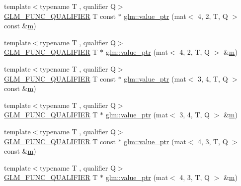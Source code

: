 \begin{DoxyCompactItemize}
\item 
{\footnotesize template$<$typename T , qualifier Q$>$ }\\\hyperlink{setup_8hpp_a33fdea6f91c5f834105f7415e2a64407}{G\+L\+M\+\_\+\+F\+U\+N\+C\+\_\+\+Q\+U\+A\+L\+I\+F\+I\+ER} T const  $\ast$ \hyperlink{group__gtc__type__ptr_gaf8be997c8fa6dea9773f195e35f2df05}{glm\+::value\+\_\+ptr} (mat$<$ 4, 2, T, Q $>$ const \&\hyperlink{_s_d_l__opengl__glext_8h_af593500c283bf1a787a6f947f503a5c2}{m})
\item 
{\footnotesize template$<$typename T , qualifier Q$>$ }\\\hyperlink{setup_8hpp_a33fdea6f91c5f834105f7415e2a64407}{G\+L\+M\+\_\+\+F\+U\+N\+C\+\_\+\+Q\+U\+A\+L\+I\+F\+I\+ER} T $\ast$ \hyperlink{group__gtc__type__ptr_gabf9cfd331a42dd9feb54a5cbc858509a}{glm\+::value\+\_\+ptr} (mat$<$ 4, 2, T, Q $>$ \&\hyperlink{_s_d_l__opengl__glext_8h_af593500c283bf1a787a6f947f503a5c2}{m})
\item 
{\footnotesize template$<$typename T , qualifier Q$>$ }\\\hyperlink{setup_8hpp_a33fdea6f91c5f834105f7415e2a64407}{G\+L\+M\+\_\+\+F\+U\+N\+C\+\_\+\+Q\+U\+A\+L\+I\+F\+I\+ER} T const  $\ast$ \hyperlink{group__gtc__type__ptr_gaf93bd83ae6520e9cdafdcd3f483dfeb3}{glm\+::value\+\_\+ptr} (mat$<$ 3, 4, T, Q $>$ const \&\hyperlink{_s_d_l__opengl__glext_8h_af593500c283bf1a787a6f947f503a5c2}{m})
\item 
{\footnotesize template$<$typename T , qualifier Q$>$ }\\\hyperlink{setup_8hpp_a33fdea6f91c5f834105f7415e2a64407}{G\+L\+M\+\_\+\+F\+U\+N\+C\+\_\+\+Q\+U\+A\+L\+I\+F\+I\+ER} T $\ast$ \hyperlink{group__gtc__type__ptr_ga9b9841a59cedf4f06882863900c36787}{glm\+::value\+\_\+ptr} (mat$<$ 3, 4, T, Q $>$ \&\hyperlink{_s_d_l__opengl__glext_8h_af593500c283bf1a787a6f947f503a5c2}{m})
\item 
{\footnotesize template$<$typename T , qualifier Q$>$ }\\\hyperlink{setup_8hpp_a33fdea6f91c5f834105f7415e2a64407}{G\+L\+M\+\_\+\+F\+U\+N\+C\+\_\+\+Q\+U\+A\+L\+I\+F\+I\+ER} T const  $\ast$ \hyperlink{group__gtc__type__ptr_ga50654758b47589e7dea0aa0bcb50adfb}{glm\+::value\+\_\+ptr} (mat$<$ 4, 3, T, Q $>$ const \&\hyperlink{_s_d_l__opengl__glext_8h_af593500c283bf1a787a6f947f503a5c2}{m})
\item 
{\footnotesize template$<$typename T , qualifier Q$>$ }\\\hyperlink{setup_8hpp_a33fdea6f91c5f834105f7415e2a64407}{G\+L\+M\+\_\+\+F\+U\+N\+C\+\_\+\+Q\+U\+A\+L\+I\+F\+I\+ER} T $\ast$ \hyperlink{group__gtc__type__ptr_gad33202dd8b191c31df6ed81b63bc2e52}{glm\+::value\+\_\+ptr} (mat$<$ 4, 3, T, Q $>$ \&\hyperlink{_s_d_l__opengl__glext_8h_af593500c283bf1a787a6f947f503a5c2}{m})

\end{DoxyCompactItemize}
